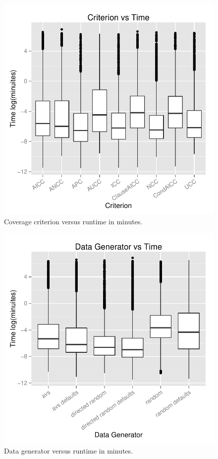 \begin{figure}
\centering
  \centering
  \includegraphics[width=1\linewidth]{../diagrams/CriterionvsTime.pdf}
  \caption{Coverage criterion versus runtime in minutes.\vspace{-.15in}}
  \label{fig:crites}
  \vspace{-.15in} 
\end{figure}

\begin{figure}
\centering
  \centering
  \includegraphics[width=1\linewidth]{../diagrams/DataGeneratorvsTime.pdf}
  \caption{Data generator versus runtime in minutes.\vspace{-.15in}}
  \label{fig:datas}
  \vspace{-.15in} 
\end{figure}


